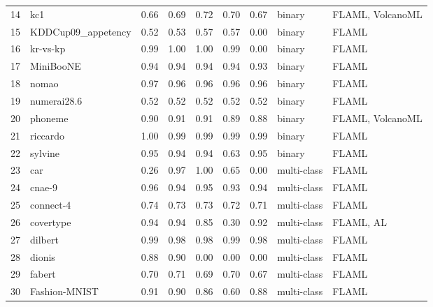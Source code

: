 \begin{table*}
\begin{tabular}{lllllllll}
14 & kc1                                         & 0.66 & 0.69 & 0.72 & 0.70 & 0.67 & binary      & FLAML, VolcanoML \\
15 & KDDCup09\_appetency                         & 0.52 & 0.53 & 0.57 & 0.57 & 0.00 & binary      & FLAML            \\
16 & kr-vs-kp                                    & 0.99 & 1.00 & 1.00 & 0.99 & 0.00 & binary      & FLAML            \\
17 & MiniBooNE                                   & 0.94 & 0.94 & 0.94 & 0.94 & 0.93 & binary      & FLAML            \\
18 & nomao                                       & 0.97 & 0.96 & 0.96 & 0.96 & 0.96 & binary      & FLAML            \\
19 & numerai28.6                                 & 0.52 & 0.52 & 0.52 & 0.52 & 0.52 & binary      & FLAML            \\
20 & phoneme                                     & 0.90 & 0.91 & 0.91 & 0.89 & 0.88 & binary      & FLAML, VolcanoML \\
21 & riccardo                                    & 1.00 & 0.99 & 0.99 & 0.99 & 0.99 & binary      & FLAML            \\
22 & sylvine                                     & 0.95 & 0.94 & 0.94 & 0.63 & 0.95 & binary      & FLAML            \\
23 & car                                         & 0.26 & 0.97 & 1.00 & 0.65 & 0.00 & multi-class & FLAML            \\
24 & cnae-9                                      & 0.96 & 0.94 & 0.95 & 0.93 & 0.94 & multi-class & FLAML            \\
25 & connect-4                                   & 0.74 & 0.73 & 0.73 & 0.72 & 0.71 & multi-class & FLAML            \\
26 & covertype                                   & 0.94 & 0.94 & 0.85 & 0.30 & 0.92 & multi-class & FLAML, AL        \\
27 & dilbert                                     & 0.99 & 0.98 & 0.98 & 0.99 & 0.98 & multi-class & FLAML            \\
28 & dionis                                      & 0.88 & 0.90 & 0.00 & 0.00 & 0.00 & multi-class & FLAML            \\
29 & fabert                                      & 0.70 & 0.71 & 0.69 & 0.70 & 0.67 & multi-class & FLAML            \\
30 & Fashion-MNIST                               & 0.91 & 0.90 & 0.86 & 0.60 & 0.88 & multi-class & FLAML            \\

\end{tabular}
\end{table*}
